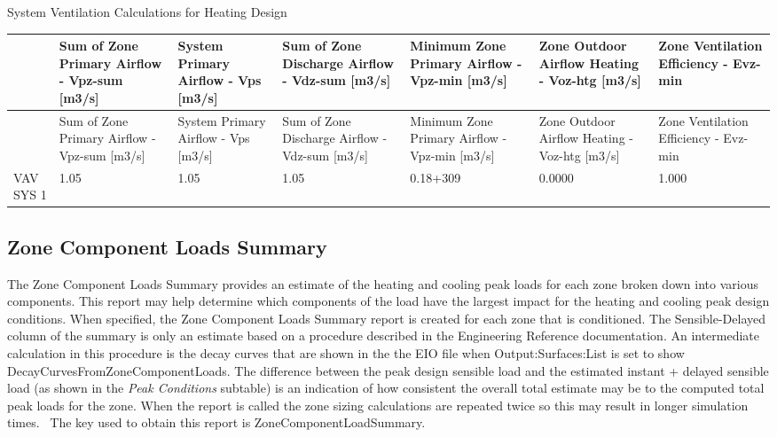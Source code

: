 System Ventilation Calculations for Heating Design

{\scriptsize
\begin{longtable}[c]{>{\raggedright}p{0.85in}>{\raggedright}p{0.85in}>{\raggedright}p{0.85in}>{\raggedright}p{0.85in}>{\raggedright}p{0.85in}>{\raggedright}p{0.85in}>{\raggedright}p{0.85in}}
\toprule 
 & Sum of Zone Primary Airflow - Vpz-sum [m3/s] & System Primary Airflow - Vps [m3/s] & Sum of Zone Discharge Airflow - Vdz-sum [m3/s] & Minimum Zone Primary Airflow - Vpz-min [m3/s] & Zone Outdoor Airflow Heating - Voz-htg [m3/s] & Zone Ventilation Efficiency - Evz-min \tabularnewline
\midrule
\endfirsthead

\toprule 
 & Sum of Zone Primary Airflow - Vpz-sum [m3/s] & System Primary Airflow - Vps [m3/s] & Sum of Zone Discharge Airflow - Vdz-sum [m3/s] & Minimum Zone Primary Airflow - Vpz-min [m3/s] & Zone Outdoor Airflow Heating - Voz-htg [m3/s] & Zone Ventilation Efficiency - Evz-min \tabularnewline
\midrule
\endhead

VAV SYS 1 & 1.05 & 1.05 & 1.05 & 0.18+309 & 0.0000 & 1.000 \tabularnewline
\bottomrule
\end{longtable}}

\subsection{Zone Component Loads Summary}\label{zone-component-loads-summary}

The Zone Component Loads Summary provides an estimate of the heating and cooling peak loads for each zone broken down into various components. This report may help determine which components of the load have the largest impact for the heating and cooling peak design conditions. When specified, the Zone Component Loads Summary report is created for each zone that is conditioned. The Sensible-Delayed column of the summary is only an estimate based on a procedure described in the Engineering Reference documentation. An intermediate calculation in this procedure is the decay curves that are shown in the the EIO file when Output:Surfaces:List is set to show DecayCurvesFromZoneComponentLoads. The difference between the peak design sensible load and the estimated instant + delayed sensible load (as shown in the \emph{Peak Conditions} subtable) is an indication of how consistent the overall total estimate may be to the computed total peak loads for the zone. When the report is called the zone sizing calculations are repeated twice so this may result in longer simulation times.~ The key used to obtain this report is ZoneComponentLoadSummary.

